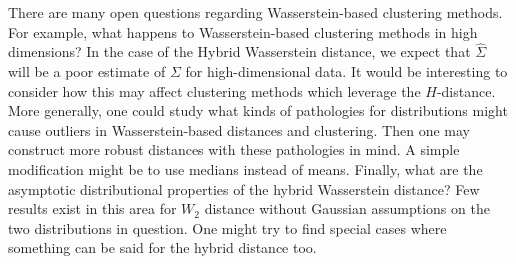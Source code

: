\documentclass[11pt, a4paper, fleqn]{article}
\numberwithin{equation}{section}
\numberwithin{figure}{section}
\numberwithin{table}{section}
\begin{document}
There are many open questions regarding Wasserstein-based clustering methods. For example, what happens to Wasserstein-based clustering methods in high dimensions? In the case of the Hybrid Wasserstein distance, we expect that $\hat{\Sigma}$ will be a poor estimate of $\Sigma$ for high-dimensional data. It would be interesting to consider how this may affect clustering methods which leverage the $H$-distance. More generally, one could study what kinds of pathologies for distributions might cause outliers in Wasserstein-based distances and clustering. Then one may construct more robust distances with these pathologies in mind. A simple modification might be to use medians instead of means. Finally, what are the asymptotic distributional properties of the hybrid Wasserstein distance? Few results exist in this area for $W_2$ distance without Gaussian assumptions on the two distributions in question. One might try to find special cases where something can be said for the hybrid distance too.




\end{document}
